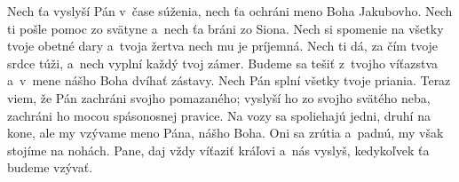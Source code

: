 Nech ťa vyslyší Pán v~čase súženia,
nech ťa ochráni meno Boha Jakubovho.
\versseparator
Nech ti pošle pomoc zo svätyne
a~nech ťa bráni zo Siona.
\versseparator
Nech si spomenie na všetky tvoje obetné dary
a~tvoja žertva nech mu je príjemná.
\versseparator
Nech ti dá, za čím tvoje srdce túži,
a~nech vyplní každý tvoj zámer.
\versseparator
Budeme sa tešiť z~tvojho víťazstva
a~v~mene nášho Boha dvíhať zástavy.
\versseparator
Nech Pán splní všetky tvoje priania.
Teraz viem, že Pán zachráni svojho pomazaného;
\versseparator
vyslyší ho zo svojho svätého neba,
zachráni ho mocou spásonosnej pravice.
\versseparator
Na vozy sa spoliehajú jedni, druhí na kone,
ale my vzývame meno Pána, nášho Boha.
\versseparator
Oni sa zrútia a~padnú,
my však stojíme na nohách.
\versseparator
Pane, daj vždy víťaziť kráľovi
a~nás vyslyš, kedykoľvek ťa budeme vzývať.
